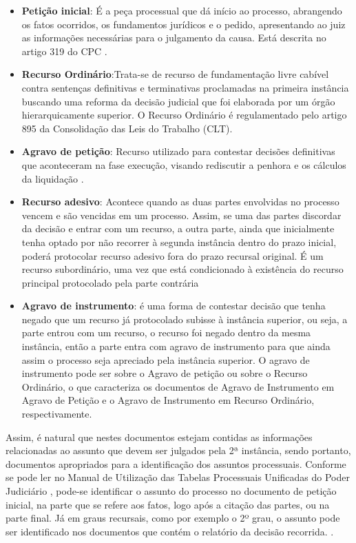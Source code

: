 \begin{itemize}
\item \textbf{Petição inicial}: É a peça processual que dá início ao processo, abrangendo os fatos ocorridos, os fundamentos jurídicos e o pedido, apresentando ao juiz as informações necessárias para o julgamento da causa. Está descrita no artigo 319 do CPC \cite{novocpc}.

\item \textbf{Recurso Ordinário}:Trata-se de recurso de fundamentação livre cabível contra sentenças definitivas e terminativas proclamadas na primeira instância buscando uma reforma da decisão judicial que foi elaborada por um órgão hierarquicamente superior. O Recurso Ordinário é regulamentado pelo artigo 895 da Consolidação das Leis do Trabalho (CLT)\cite{recursos}.

\item \textbf{Agravo de petição}: Recurso utilizado para contestar decisões definitivas que aconteceram na fase execução, visando rediscutir a penhora e os cálculos da liquidação \cite{recursos,agravopeticao}.

\item \textbf{Recurso adesivo}: Acontece quando as duas partes envolvidas no processo vencem e são vencidas em um processo. Assim, se uma das partes discordar da decisão e entrar com um recurso, a outra parte, ainda que inicialmente tenha optado por não recorrer à segunda instância dentro do prazo inicial, poderá protocolar recurso adesivo fora do prazo recursal original. É um recurso subordinário, uma vez que está condicionado à existência do recurso principal protocolado pela parte contrária \cite{recursos}

\item \textbf{Agravo de instrumento}: é uma forma de contestar decisão que tenha negado que um recurso já protocolado subisse à instância superior, ou seja, a parte entrou com um recurso, o recurso foi negado dentro da mesma instância, então a parte entra com agravo de instrumento para que ainda assim o processo seja apreciado pela instância superior. O agravo de instrumento pode ser sobre o Agravo de petição ou sobre o Recurso Ordinário, o que caracteriza os documentos de Agravo de Instrumento em Agravo de Petição e o Agravo de Instrumento em Recurso Ordinário, respectivamente. \cite{agravoinstrumento}
\end{itemize}

    Assim, é natural que nestes documentos estejam contidas as informações relacionadas ao assunto que devem ser julgados pela 2ª instância, sendo portanto,  documentos apropriados para a identificação dos assuntos processuais. Conforme se pode ler no Manual de Utilização das Tabelas Processuais Unificadas do Poder Judiciário \cite{manualtpucnj}, pode-se identificar o assunto do processo no documento de petição inicial, na parte que se refere aos fatos, logo após a citação das partes, ou na parte final. Já em graus recursais, como por exemplo o 2º grau, o assunto pode ser identificado nos documentos que contém o relatório da decisão recorrida. \label{sec:entendimentoNegocio}.
    

